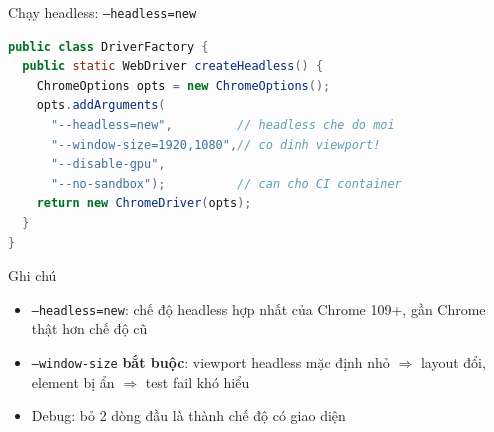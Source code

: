 \documentclass[aspectratio=169,12pt]{beamer}
\begin{document}
\begin{frame}[fragile]{Chạy headless: \texttt{--headless=new}}
  \vspace*{-0.3em}
\begin{lstlisting}[language=Java,basicstyle=\ttfamily\scriptsize]
public class DriverFactory {
  public static WebDriver createHeadless() {
    ChromeOptions opts = new ChromeOptions();
    opts.addArguments(
      "--headless=new",         // headless che do moi
      "--window-size=1920,1080",// co dinh viewport!
      "--disable-gpu",
      "--no-sandbox");          // can cho CI container
    return new ChromeDriver(opts);
  }
}
\end{lstlisting}

  \begin{block}{Ghi chú}
    \begin{itemize}
      \item \texttt{--headless=new}: chế độ headless hợp nhất của
            Chrome 109+, gần Chrome thật hơn chế độ cũ
      \item \texttt{--window-size} \textbf{bắt buộc}: viewport headless
            mặc định nhỏ $\Rightarrow$ layout đổi, element bị ẩn
            $\Rightarrow$ test fail khó hiểu
      \item Debug: bỏ 2 dòng đầu là thành chế độ có giao diện
    \end{itemize}
  \end{block}
\end{frame}
\end{document}
